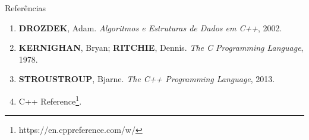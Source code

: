 \begin{frame}[fragile]{Referências}

    \begin{enumerate}
        \item \textbf{DROZDEK}, Adam. \textit{Algoritmos e Estruturas de Dados em C++}, 2002.

        \item \textbf{KERNIGHAN}, Bryan; \textbf{RITCHIE}, Dennis. \textit{The C Programming Language}, 1978.

        \item \textbf{STROUSTROUP}, Bjarne. \textit{The C++ Programming Language}, 2013.

		\item C++ Reference\footnote{https://en.cppreference.com/w/}.
    \end{enumerate}

\end{frame}
